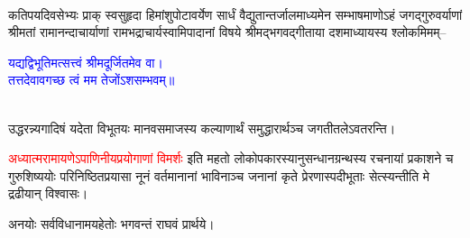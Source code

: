 \vspace{4mm}
\fontsize{14}{21}\selectfont
{}\nopagebreak\\
\vspace{4mm}
\fontsize{14}{21}\selectfont
\begin{sloppypar}\justifying\noindent\hspace{10mm} कतिपय\-दिवसेभ्यः प्राक् स्वसुहृदा हिमांशु\-पोटा\-वर्येण सार्धं वैद्युतान्तर्जाल\-माध्यमेन सम्भाष\-माणोऽहं जगद्गुरु\-वर्याणां श्रीमतां रामानन्दाचार्याणां रामभद्राचार्य\-स्वामिपादानां विषये श्रीमद्भगवद्गीताया दशमाध्यायस्य श्लोकमिमम्–\end{sloppypar}
\fontsize{14}{21}\selectfont\centering\textcolor{blue}{यद्यद्विभूतिमत्सत्त्वं श्रीमदूर्जितमेव वा।\nopagebreak\\
तत्तदेवावगच्छ त्वं मम तेजोंऽशसम्भवम्॥}\\
\nopagebreak\\
\begin{sloppypar}\justifying\noindent\noindent उद्धरन्न्यगादिषं यदेता विभूतयः मानव\-समाजस्य कल्याणार्थं समुद्धारार्थञ्च जगती\-तलेऽवतरन्ति।\end{sloppypar}
\pagebreak
\begin{sloppypar}\justifying\noindent\hspace{10mm} \textcolor{red}{अध्यात्म\-रामायणेऽ\-पाणिनीय\-प्रयोगाणां विमर्शः} इति महतो लोकोपकारस्यानु\-सन्धान\-ग्रन्थस्य रचनायां प्रकाशने च गुरु\-शिष्ययोः परिनिष्ठित\-प्रयासा नूनं वर्तमानानां भाविनाञ्च जनानां कृते प्रेरणास्पदी\-भूताः सेत्स्यन्तीति मे द्रढीयान् विश्वासः।\end{sloppypar}
\begin{sloppypar}\justifying\noindent\hspace{10mm} अनयोः सर्व\-विधानामय\-हेतोः भगवन्तं राघवं प्रार्थये।\end{sloppypar}
\vspace{4mm}
\fontsize{14}{19}\selectfont
{}\nopagebreak\\
\fontsize{12}{16}\selectfont
{}\\

